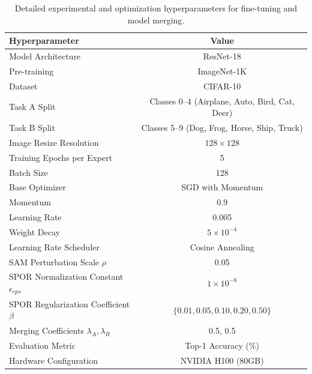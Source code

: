 \documentclass{article}
\theoremstyle{plain}
\theoremstyle{definition}
\theoremstyle{remark}
\begin{document}
\begin{table}[h]
\caption{Detailed experimental and optimization hyperparameters for fine-tuning and model merging.}
\label{table:hyperparams}
\vskip 0.15in
\begin{center}
\begin{small}
\begin{tabular}{lc}
\toprule
Hyperparameter & Value \\
\midrule
Model Architecture & ResNet-18 \\
Pre-training & ImageNet-1K \\
Dataset & CIFAR-10 \\
Task A Split & Classes 0--4 (Airplane, Auto, Bird, Cat, Deer) \\
Task B Split & Classes 5--9 (Dog, Frog, Horse, Ship, Truck) \\
Image Resize Resolution & $128 \times 128$ \\
Training Epochs per Expert & 5 \\
Batch Size & 128 \\
Base Optimizer & SGD with Momentum \\
Momentum & 0.9 \\
Learning Rate & 0.005 \\
Weight Decay & $5 \times 10^{-4}$ \\
Learning Rate Scheduler & Cosine Annealing \\
SAM Perturbation Scale $\rho$ & 0.05 \\
SPOR Normalization Constant $\epsilon_{eps}$ & $1 \times 10^{-8}$ \\
SPOR Regularization Coefficient $\beta$ & $\{0.01, 0.05, 0.10, 0.20, 0.50\}$ \\
Merging Coefficients $\lambda_A, \lambda_B$ & 0.5, 0.5 \\
Evaluation Metric & Top-1 Accuracy (\%) \\
Hardware Configuration & NVIDIA H100 (80GB) \\
\bottomrule
\end{tabular}
\end{small}
\end{center}
\vskip -0.1in
\end{table}
\end{document}

